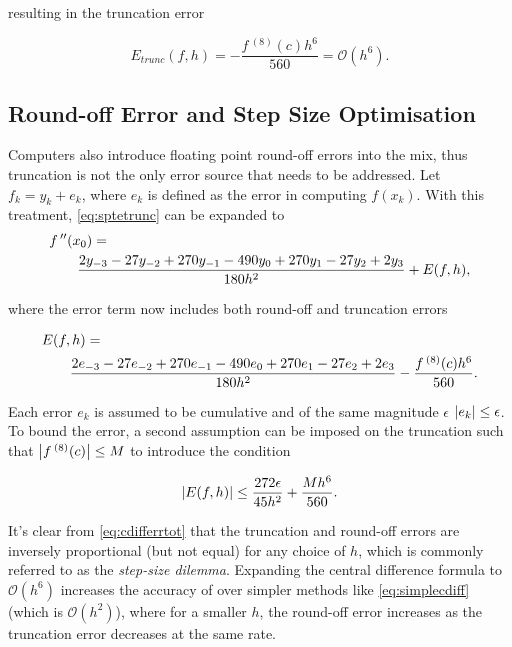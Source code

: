 resulting in the truncation error

\begin{equation}
E_{trunc}(f,h) = -\frac{f\,^{(8)}(c)h^6}{560} = \mathcal{O}(h^6).\label{eq:etrunc}
\end{equation}

\subsection{Round-off Error and Step Size Optimisation}\label{sec:cdiffstep}

Computers also introduce floating point round-off errors into the mix, thus truncation is not the only error source that needs to be addressed. Let $f_k = y_k +e_k$, where $e_k$ is defined as the error in computing $f(x_k)$. With this treatment, \cref{eq:sptetrunc} can be expanded to
\begin{align}
\MoveEqLeft f\,''(x_0) = \nonumber\\
&\frac{2y_{-3}-27y_{-2}+270y_{-1}-490y_{0}+270y_{1}-27y_{2}+2y_{3}}{180h^{2}}+E(f,h),\label{eq:sptye}
\end{align}

where the error term now includes both round-off and truncation errors

\begin{align}
\MoveEqLeft E(f,h) = \nonumber\\
&\frac{2e_{-3}-27e_{-2}+270e_{-1}-490e_{0}+270e_{1}-27e_{2}+2e_{3}}{180h^{2}}-\frac{f\,^{(8)}(c)h^6}{560}.
\end{align}

Each error $e_k$ is assumed to be cumulative and of the same magnitude $\epsilon$ \ie $\left\lvert e_k\right\rvert \leq \epsilon$. To bound the error, a second assumption can be imposed on the truncation such that $\left\lvert f\,^{(8)}(c)\right\rvert \leq M$ to introduce the condition

\begin{equation}
\left\lvert E(f,h)\right\rvert \leq \frac{272\epsilon}{45h^2}+\frac{Mh^6}{560}.\label{eq:cdifferrtot}
\end{equation}

It's clear from \cref{eq:cdifferrtot} that the truncation and round-off errors are inversely proportional (but not equal) for any choice of $h$, which is commonly referred to as the \emph{step-size dilemma}. Expanding the central difference formula to $\mathcal{O}(h^6)$ increases the accuracy of over simpler methods like \cref{eq:simplecdiff} (which is $\mathcal{O}(h^2)$), where for a smaller $h$, the round-off error increases as the truncation error decreases at the same rate.

